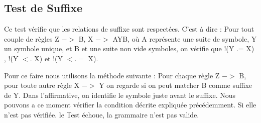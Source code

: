 	\subsection{Test de Suffixe}
		Ce test vérifie que les relations de suffixe sont respectées. C'est à dire :
		Pour tout couple de règles Z $->$ B, X $->$ AYB, où A représente une suite de symbole, Y un symbole unique,
		et B et une suite non vide symboles, on vérifie que !(Y .= X) , !(Y $<.$ X) et !(Y $<.=$ X).
		
		Pour ce faire nous utilisons la méthode suivante : 
		Pour chaque règle Z $->$ B, pour toute autre règle X $->$ Y on regarde si on peut matcher B comme suffixe de Y.
		Dans l'affirmative, on identifie le symbole juste avant le suffixe. Nous pouvons a ce moment vérifier la
		condition décrite expliquée précédemment. Si elle n'est pas vérifiée. le Test échoue, la grammaire n'est pas valide.
